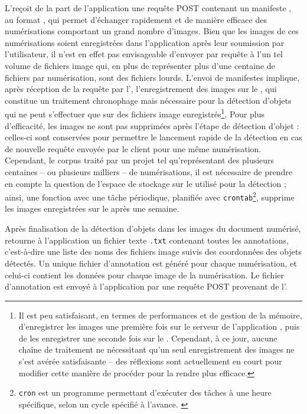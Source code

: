 	L'\api reçoit de la part de l'application une requête POST contenant un manifeste \iiif, au format \json, qui permet d'échanger rapidement et de manière efficace des numérisations comportant un grand nombre d'images. Bien que les images de ces numérisations soient enregistrées dans l'application \eida après leur soumission par l'utilisateur, il n'est en effet pas envisageable d'envoyer par requête \http à l'\api un tel volume de fichiers image qui, en plus de représenter plus d'une centaine de fichiers par numérisation, sont des fichiers lourds. L'envoi de manifestes \iiif implique, après réception de la requête par l'\api, l'enregistrement des images sur le \gpu, qui constitue un traitement chronophage mais nécessaire pour la détection d'objets qui ne peut s'effectuer que sur des fichiers image enregistrés\footnote{Il est peu satisfaisant, en termes de performances et de gestion de la mémoire, d'enregistrer les images une première fois sur le serveur de l'application \eida, puis de les enregistrer une seconde fois sur le \gpu. Cependant, à ce jour, aucune chaîne de traitement ne nécessitant qu'un seul enregistrement des images ne s'est avérée satisfaisante -- des réflexions sont actuellement en court pour modifier cette manière de procéder pour la rendre plus efficace.}. Pour plus d'efficacité, les images ne sont pas supprimées après l'étape de détection d'objet : celles-ci sont conservées pour permettre le lancement rapide de la détection en cas de nouvelle requête envoyée par le client pour une même numérisation. Cependant, le corpus traité par un projet tel qu'\eida représentant des plusieurs centaines -- ou plusieurs milliers -- de numérisations, il est nécessaire de prendre en compte la question de l'espace de stockage sur le \gpu utilisé pour la détection ; ainsi, une fonction avec une tâche périodique, planifiée avec \texttt{crontab}\footnote{\texttt{cron} est un programme permettant d'exécuter des tâches à une heure spécifique, selon un cycle spécifié à l'avance. \cite{Cron2023}}, supprime les images enregistrées sur le \gpu après une semaine.
	
	Après finalisation de la détection d'objets dans les images du document numérisé, \exapi retourne à l'application un fichier texte \texttt{.txt} contenant toutes les annotations, c'est-à-dire une liste des noms des fichiers image suivis des coordonnées des objets détectés. Un unique fichier d'annotation est généré pour chaque numérisation, et celui-ci contient les données pour chaque image de la numérisation. Le fichier d'annotation est envoyé à l'application \eida par une requête POST provenant de l'\api.
	
